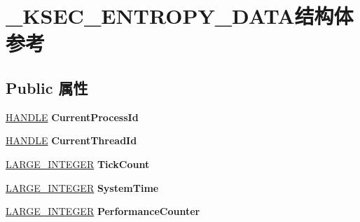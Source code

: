 \hypertarget{struct___k_s_e_c___e_n_t_r_o_p_y___d_a_t_a}{}\section{\+\_\+\+K\+S\+E\+C\+\_\+\+E\+N\+T\+R\+O\+P\+Y\+\_\+\+D\+A\+T\+A结构体 参考}
\label{struct___k_s_e_c___e_n_t_r_o_p_y___d_a_t_a}
\subsection*{Public 属性}
\begin{DoxyCompactItemize}
\item 
\mbox{\label{struct___k_s_e_c___e_n_t_r_o_p_y___d_a_t_a_a3390fa8a5fbffb2628b6666504127791}} 
\hyperlink{interfacevoid}{H\+A\+N\+D\+LE} {\bfseries Current\+Process\+Id}
\item 
\mbox{\label{struct___k_s_e_c___e_n_t_r_o_p_y___d_a_t_a_ac13d2ddccc480baa7b9fa90765e99957}} 
\hyperlink{interfacevoid}{H\+A\+N\+D\+LE} {\bfseries Current\+Thread\+Id}
\item 
\mbox{\label{struct___k_s_e_c___e_n_t_r_o_p_y___d_a_t_a_a7466164eda10bd4266ef9e229503afeb}} 
\hyperlink{union___l_a_r_g_e___i_n_t_e_g_e_r}{L\+A\+R\+G\+E\+\_\+\+I\+N\+T\+E\+G\+ER} {\bfseries Tick\+Count}
\item 
\mbox{\label{struct___k_s_e_c___e_n_t_r_o_p_y___d_a_t_a_ac5b4bd4e851730fd7134c37fbf594c66}} 
\hyperlink{union___l_a_r_g_e___i_n_t_e_g_e_r}{L\+A\+R\+G\+E\+\_\+\+I\+N\+T\+E\+G\+ER} {\bfseries System\+Time}
\item 
\mbox{\label{struct___k_s_e_c___e_n_t_r_o_p_y___d_a_t_a_ad48c8929a368afc7b709c2c3d3d41766}} 
\hyperlink{union___l_a_r_g_e___i_n_t_e_g_e_r}{L\+A\+R\+G\+E\+\_\+\+I\+N\+T\+E\+G\+ER} {\bfseries Performance\+Counter}
\item 
\mbox{\label{struct___k_s_e_c___e_n_t_r_o_p_y___d_a_t_a_a921e35c58ead1308cdcfef9ef25cc5cb}} 

\end{DoxyCompactItemize}
